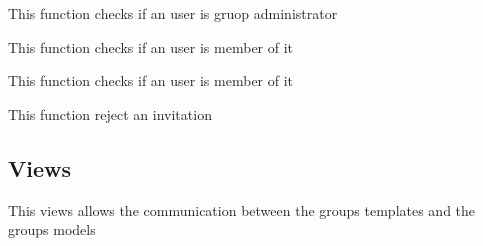 \documentclass[letterpaper,10pt,english]{sphinxmanual}
\begin{document}
\begin{fulllineitems}
\label{modules/groups:apps.groups.models.isAdministratorGroup}
This function checks if an user is gruop administrator

\end{fulllineitems}


\begin{fulllineitems}
\label{modules/groups:apps.groups.models.isMemberGroup}
This function checks if an user is member of it

\end{fulllineitems}


\begin{fulllineitems}
\label{modules/groups:apps.groups.models.isMemberGroupView}
This function checks if an user is member of it

\end{fulllineitems}


\begin{fulllineitems}
\label{modules/groups:apps.groups.models.rejectInvitation}
This function reject an invitation

\end{fulllineitems}



\subsection{Views}
\label{modules/groups:views}
This views allows the communication between the groups templates and the groups models
\label{modules/groups:module-apps.groups.views}
\end{document}

